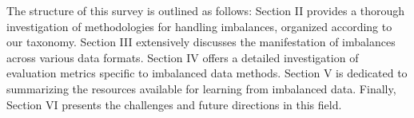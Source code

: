 The structure of this survey is outlined as follows: Section II provides a thorough investigation of methodologies for handling imbalances, organized according to our taxonomy. Section III extensively discusses the manifestation of imbalances across various data formats. 
Section IV offers a detailed investigation of evaluation metrics specific to imbalanced data methods. 
Section V is dedicated to summarizing the resources available for learning from imbalanced data. Finally, Section VI presents the challenges and future directions in this field.
























